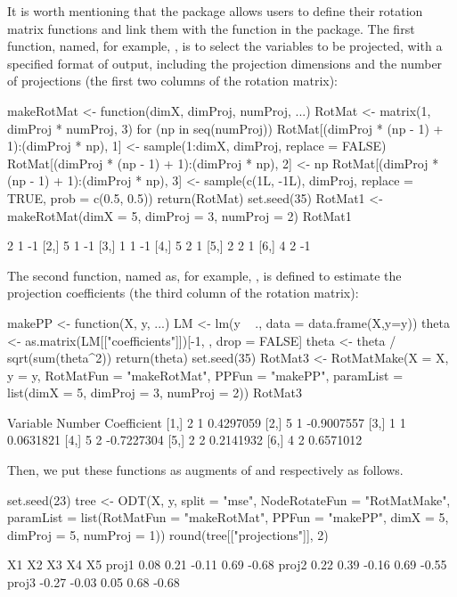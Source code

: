 It is worth mentioning that the package allows users to  define their rotation matrix functions and link them with the function  in the package.  The first function, named, for example, , is to select  the variables to be projected, with a specified format of  output, including the projection dimensions and the number of projections (the first two columns of the rotation matrix): 
\begin{example}
makeRotMat <- function(dimX, dimProj, numProj, ...) {
  RotMat <- matrix(1, dimProj * numProj, 3)
  for (np in seq(numProj)) {
    RotMat[(dimProj * (np - 1) + 1):(dimProj * np), 1] <-
    sample(1:dimX, dimProj, replace = FALSE)
    RotMat[(dimProj * (np - 1) + 1):(dimProj * np), 2] <- np
    RotMat[(dimProj * (np - 1) + 1):(dimProj * np), 3] <- 
    sample(c(1L, -1L), dimProj, replace = TRUE, prob = c(0.5, 0.5))
  }
  return(RotMat)
}
set.seed(35)
RotMat1 <- makeRotMat(dimX = 5, dimProj = 3, numProj = 2)
RotMat1
\end{example}
\begin{example}
     [,1] [,2] [,3]
[1,]    2    1   -1
[2,]    5    1   -1
[3,]    1    1   -1
[4,]    5    2    1
[5,]    2    2    1
[6,]    4    2   -1
\end{example}
The second  function, named as, for example, , is defined to estimate  the projection coefficients (the third column of the rotation matrix):
\begin{example}
makePP <- function(X, y, ...) {
  LM <- lm(y ~ ., data = data.frame(X,y=y))
  theta <- as.matrix(LM[["coefficients"]])[-1, , drop = FALSE]
  theta <- theta / sqrt(sum(theta^2))
  return(theta)
}
set.seed(35)
RotMat3 <- RotMatMake(X = X, y = y, RotMatFun = "makeRotMat", PPFun = "makePP", 
  paramList = list(dimX = 5, dimProj = 3, numProj = 2))
RotMat3
\end{example}
\begin{example}
     Variable Number Coefficient
[1,]        2      1   0.4297059
[2,]        5      1  -0.9007557
[3,]        1      1   0.0631821
[4,]        5      2  -0.7227304
[5,]        2      2   0.2141932
[6,]        4      2   0.6571012
\end{example}
Then, we put these functions as augments of  and  respectively as follows.
%
%
\begin{example}
set.seed(23)
tree <- ODT(X, y, split = "mse", NodeRotateFun = "RotMatMake", paramList = 
  list(RotMatFun = "makeRotMat", PPFun = "makePP", dimX = 5, dimProj = 5, numProj = 1))
round(tree[["projections"]], 2)
\end{example}
\begin{example}
         X1    X2    X3   X4    X5
proj1  0.08  0.21 -0.11 0.69 -0.68
proj2  0.22  0.39 -0.16 0.69 -0.55
proj3 -0.27 -0.03  0.05 0.68 -0.68
\end{example}

